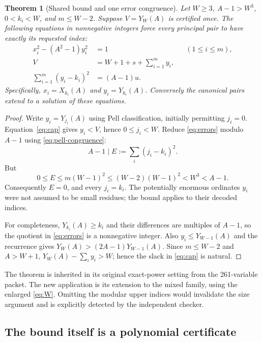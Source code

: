 \documentclass[11pt,letterpaper]{article}
\newtheorem{theorem}{Theorem}[section]
\theoremstyle{remark}\newtheorem{remark}[theorem]{Remark}
\begin{document}
\begin{theorem}[Shared bound and one error congruence]\label{thm:cap}
Let $W\ge3$, $A-1>W^3$, $0<k_i<W$, and $m\le W-2$.  Suppose
$V=Y_W(A)$ is certified once.  The following equations in nonnegative
integers force every principal pair to have exactly its requested index:
\begin{align}
 x_i^2-(A^2-1)y_i^2&=1 &&(1\le i\le m),\label{eq:norms}\\
 V&=W+1+s+\sum_{i=1}^m y_i,\label{eq:cap}\\
 \sum_{i=1}^m(y_i-k_i)^2&=(A-1)u.\label{eq:errors}
\end{align}
Specifically, $x_i=X_{k_i}(A)$ and $y_i=Y_{k_i}(A)$.
Conversely the canonical pairs extend to a solution of these equations.
\end{theorem}
\begin{proof}
Write $y_i=Y_{j_i}(A)$ using Pell classification, initially permitting
$j_i=0$.  Equation~\eqref{eq:cap} gives $y_i<V$, hence $0\le j_i<W$.
Reduce \eqref{eq:errors} modulo $A-1$ using \eqref{eq:pell-congruence}:
\[
 A-1\mid E:=\sum_i(j_i-k_i)^2.
\]
But
\[
 0\le E\le m(W-1)^2\le(W-2)(W-1)^2<W^3<A-1.
\]
Consequently $E=0$, and every $j_i=k_i$.  The potentially enormous
ordinates $y_i$ were not assumed to be small residues; the bound applies
to their decoded indices.

For completeness, $Y_{k_i}(A)\ge k_i$ and their differences are multiples
of $A-1$, so the quotient in \eqref{eq:errors} is a nonnegative integer.
Also $y_i\le Y_{W-1}(A)$ and the recurrence gives
$Y_W(A)>(2A-1)Y_{W-1}(A)$.  Since $m\le W-2$ and $A>W+1$,
$Y_W(A)-\sum_i y_i>W$; hence the slack in \eqref{eq:cap} is natural.
\end{proof}

The theorem is inherited in its original exact-power setting from the
261-variable packet.  The new application is its extension to the mixed
family, using the enlarged \eqref{eq:W}.  Omitting the modular upper
indices would invalidate the size argument and is explicitly detected
by the independent checker.

\subsection{The bound itself is a polynomial certificate}
\end{document}
